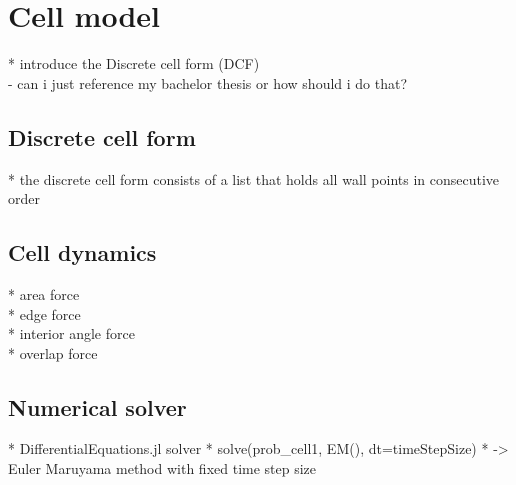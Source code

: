 \section{Cell model} 
* introduce the Discrete cell form (DCF) \\
- can i just reference my bachelor thesis or how should i do that? 

\subsection{Discrete cell form}
* the discrete cell form consists of a list that holds all wall points in consecutive order 

\subsection{Cell dynamics} 
* area force \\
* edge force \\
* interior angle force \\ 
* overlap force \\

\subsection{Numerical solver}
* DifferentialEquations.jl solver 
* solve(prob_cell1, EM(), dt=timeStepSize)
* -> Euler Maruyama method with fixed time step size  